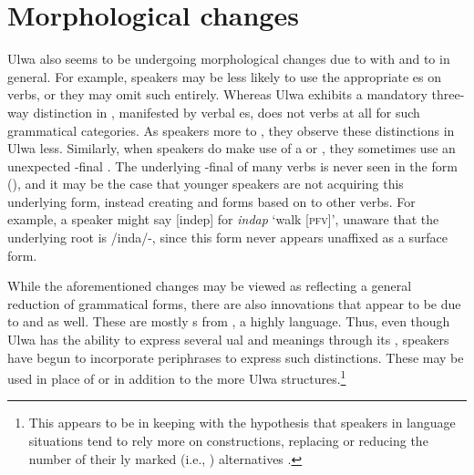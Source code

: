 
\section{Morphological changes}\label{sec:15.3}


Ulwa also seems to be undergoing morphological changes due to  with  and to  in general. For example, speakers may be less likely to use the appropriate  es on verbs, or they may omit such  entirely. Whereas Ulwa exhibits a mandatory three-way distinction in , manifested by verbal es,  does not  verbs at all for such grammatical categories. As speakers  more to , they observe these distinctions in Ulwa less. Similarly, when speakers do make use of a  or  , they sometimes use an unexpected -final . The underlying -final  of many verbs is never seen in the  form (), and it may be the case that younger speakers are not acquiring this underlying form, instead creating  and  forms based on  to other verbs. For example, a speaker might say [indep] for \textit{indap} ‘walk [\textsc{pfv}]’, unaware that the underlying root is /inda/-, since this form never appears unaffixed as a surface form.

  While the aforementioned changes may be viewed as reflecting a general reduction of grammatical forms, there are also  innovations that appear to be due to  and  as well. These are mostly s from , a highly  language. Thus, even though Ulwa has the ability to express several ual and  meanings through its , speakers have begun to incorporate periphrases to express such distinctions. These may be used in place of or in addition to the more  Ulwa structures.\footnote{This appears to be in keeping with the hypothesis that speakers in  language situations tend to rely more on  constructions, replacing or reducing the number of their ly marked (i.e., ) alternatives \citep[97]{Andersen1982}.}

